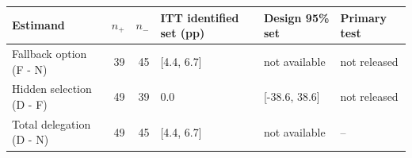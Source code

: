 \begin{tabular}{lrrlll}
\toprule
Estimand & $n_+$ & $n_-$ & ITT identified set (pp) & Design 95\% set & Primary test \\
\midrule
Fallback option (F - N) & 39 & 45 & [4.4, 6.7] & not available & not released \\
Hidden selection (D - F) & 49 & 39 & 0.0 & [-38.6, 38.6] & not released \\
Total delegation (D - N) & 49 & 45 & [4.4, 6.7] & not available & -- \\
\bottomrule
\end{tabular}
